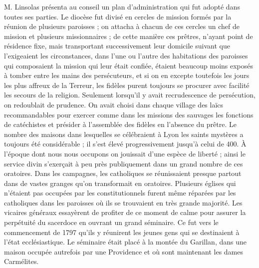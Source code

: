 M. Linsolas présenta au conseil un plan d'administration qui fut adopté dans toutes ses parties. Le diocèse fut divisé en cercles de mission formés par la réunion de plusieurs paroisses ; on attacha à chacun de ces cercles un chef de mission et plusieurs missionnaires ; de cette manière ces prêtres, n'ayant point de résidence fixe, mais transportant successivement leur domicile suivant que l'exigeaient les circonstances, dans l'une ou l'autre des habitations des paroisses qui composaient la mission qui leur était confiée, étaient beaucoup moins exposés à tomber entre les mains des persécuteurs, et si on en excepte toutefois les jours les plus affreux de la Terreur, les fidèles purent toujours se procurer avec facilité les secours de la religion. Seulement lorsqu'il y avait recrudescence de persécution, on redoublait de prudence. On avait choisi dans chaque village des laïcs recommandables pour exercer comme dans les missions des sauvages les fonctions de catéchistes et présider à l'assemblée des fidèles en l'absence du prêtre. Le nombre des maisons dans lesquelles se célébraient à Lyon les saints mystères a toujours été considérable ; il s'est élevé progressivement jusqu'à celui de 400. À l'époque dont nous nous occupons on jouissait d'une espèce de liberté ; ainsi le service divin s'exerçait à peu près publiquement dans un grand nombre de ces oratoires. Dans les campagnes, les catholiques se réunissaient presque partout dans de vastes granges qu'on transformait en oratoires. Plusieurs églises qui n'étaient pas occupées par les constitutionnels furent même réparées par les catholiques dans les paroisses
où ils se trouvaient en très grande majorité. Les vicaires généraux essayèrent de profiter de ce moment de calme pour assurer la perpétuité du sacerdoce en ouvrant un grand séminaire. Ce fut vers le commencement de 1797 qu'ils y réunirent les jeunes gens qui se destinaient à l'état ecclésiastique. Le séminaire était placé à la montée du Garillan, dans une maison occupée autrefois par une Providence et où sont maintenant les dames Carmélites.

